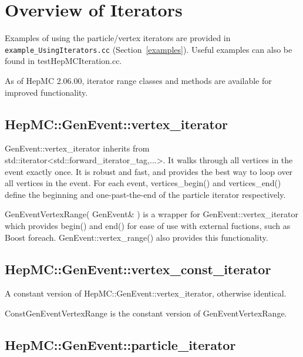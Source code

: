 \documentclass[11pt,letterpaper]{article}
\begin{document}
%
%

\section{Overview of Iterators}
\label{iterators}

Examples of using the particle/vertex iterators are provided in
\verb!example_UsingIterators.cc! (Section~\ref{examples}).  
Useful examples can also be found in testHepMCIteration.cc.

As of HepMC 2.06.00, iterator range classes and methods are 
available for improved functionality.

%
%

\subsection{HepMC::GenEvent::vertex\_iterator}

GenEvent::vertex\_iterator inherits from 
std::iterator<std::forward\_iterator\_tag,...>. 
It walks through all vertices in the event exactly once. It is robust and
fast, and provides the best way to loop over all vertices in the
event. For each event,
vertices\_begin() and vertices\_end() define the beginning and
one-past-the-end of the particle iterator respectively.

GenEventVertexRange( GenEvent\& ) is a wrapper for 
GenEvent::vertex\_iterator which provides begin() and end() for
ease of use with external fuctions, such as Boost foreach.
GenEvent::vertex\_range() also provides this functionality.

%
%

\subsection{HepMC::GenEvent::vertex\_const\_iterator}

A constant version of HepMC::GenEvent::vertex\_iterator, otherwise identical.

ConstGenEventVertexRange is the constant version of GenEventVertexRange.

%
%

\subsection{HepMC::GenEvent::particle\_iterator}
\end{document}
